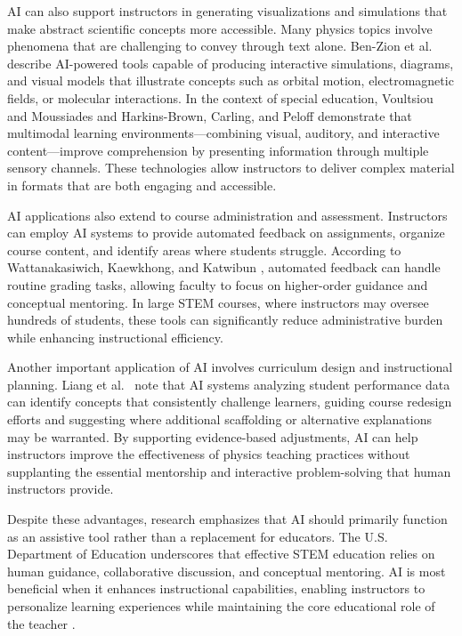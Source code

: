 \documentclass[]{aastex701}
\begin{document}
AI can also support instructors in generating visualizations and simulations that make abstract scientific concepts more accessible. Many physics topics involve phenomena that are challenging to convey through text alone. Ben-Zion et al.\ \citep{BenZion2025} describe AI-powered tools capable of producing interactive simulations, diagrams, and visual models that illustrate concepts such as orbital motion, electromagnetic fields, or molecular interactions. In the context of special education, Voultsiou and Moussiades \citep{Voultsiou2025} and Harkins-Brown, Carling, and Peloff \citep{HarkinsBrown2025} demonstrate that multimodal learning environments---combining visual, auditory, and interactive content---improve comprehension by presenting information through multiple sensory channels. These technologies allow instructors to deliver complex material in formats that are both engaging and accessible.

AI applications also extend to course administration and assessment. Instructors can employ AI systems to provide automated feedback on assignments, organize course content, and identify areas where students struggle. According to Wattanakasiwich, Kaewkhong, and Katwibun \citep{Wattanakasiwich2025}, automated feedback can handle routine grading tasks, allowing faculty to focus on higher-order guidance and conceptual mentoring. In large STEM courses, where instructors may oversee hundreds of students, these tools can significantly reduce administrative burden while enhancing instructional efficiency.

Another important application of AI involves curriculum design and instructional planning. Liang et al.\ \citep{Liang2026} note that AI systems analyzing student performance data can identify concepts that consistently challenge learners, guiding course redesign efforts and suggesting where additional scaffolding or alternative explanations may be warranted. By supporting evidence-based adjustments, AI can help instructors improve the effectiveness of physics teaching practices without supplanting the essential mentorship and interactive problem-solving that human instructors provide.

Despite these advantages, research emphasizes that AI should primarily function as an assistive tool rather than a replacement for educators. The U.S. Department of Education \citep{USDOE2023} underscores that effective STEM education relies on human guidance, collaborative discussion, and conceptual mentoring. AI is most beneficial when it enhances instructional capabilities, enabling instructors to personalize learning experiences while maintaining the core educational role of the teacher \citep{USDOE2023, Sakowicz2025}.
\end{document}

